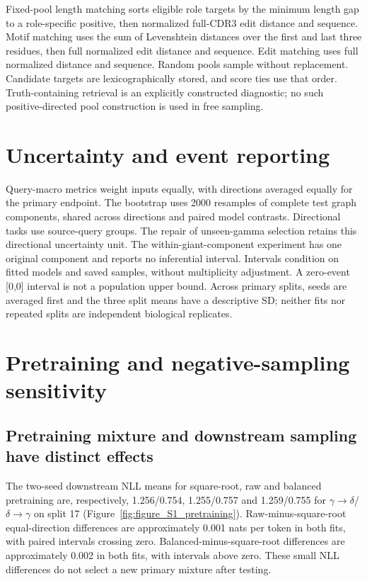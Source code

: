 \documentclass[11pt]{article}
\newcommand{\gtd}{\ensuremath{\gamma\!\rightarrow\!\delta}}
\newcommand{\dtg}{\ensuremath{\delta\!\rightarrow\!\gamma}}
\begin{document}
Fixed-pool length matching sorts eligible role targets by the minimum length
gap to a role-specific positive, then normalized full-CDR3 edit distance and
sequence. Motif matching uses the sum of Levenshtein distances over the first
and last three residues, then full normalized edit distance and sequence. Edit
matching uses full normalized distance and sequence. Random pools sample
without replacement. Candidate targets are lexicographically stored, and score
ties use that order. Truth-containing retrieval is an explicitly constructed
diagnostic; no such positive-directed pool construction is used in free sampling.

\section{Uncertainty and event reporting}
Query-macro metrics weight inputs equally, with directions averaged equally for
the primary endpoint. The bootstrap uses 2000 resamples of complete test graph
components, shared across directions and paired model contrasts. Directional
tasks use source-query groups. The repair of unseen-gamma selection retains
this directional uncertainty unit. The within-giant-component experiment has
one original component and reports no inferential interval. Intervals condition
on fitted models and saved samples, without multiplicity adjustment. A zero-event
[0,0] interval is not a population upper bound. Across primary splits, seeds
are averaged first and the three split means have a descriptive SD; neither
fits nor repeated splits are independent biological replicates.

\section{Pretraining and negative-sampling sensitivity}
\subsection{Pretraining mixture and downstream sampling have distinct effects}
The two-seed downstream NLL means for square-root, raw and balanced pretraining
are, respectively, 1.256/0.754, 1.255/0.757 and 1.259/0.755 for \gtd{}/\dtg{}
on split 17 (Figure~\ref{fig:figure_S1_pretraining}). Raw-minus-square-root
equal-direction differences are approximately 0.001 nats per token in both
fits, with paired intervals crossing zero. Balanced-minus-square-root
differences are approximately 0.002 in both fits, with intervals above zero.
These small NLL differences do not select a new primary mixture after testing.
\end{document}
